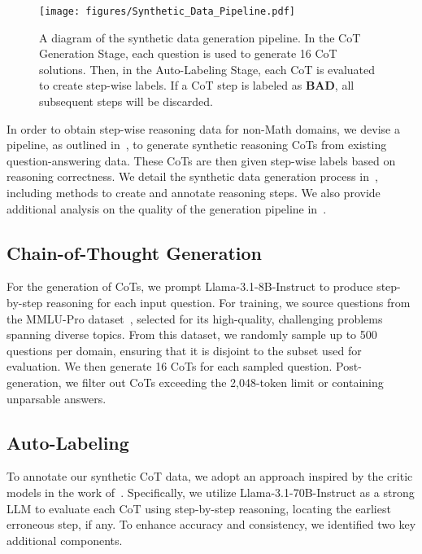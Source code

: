 \begin{figure*}[ht]
    \begin{center}
        \texttt{[image: figures/Synthetic\_Data\_Pipeline.pdf]}
        \caption{A diagram of the synthetic data generation pipeline. In the CoT Generation Stage, each question is used to generate 16 CoT solutions. Then, in the Auto-Labeling Stage, each CoT is evaluated to create step-wise labels. If a CoT step is labeled as \textbf{BAD}, all subsequent steps will be discarded.}
        \label{fig:synth-data-pipeline-diagram}
    \end{center}
    \vskip -0.2in
\end{figure*}




In order to obtain step-wise reasoning data for non-Math domains,
we devise a pipeline,
as outlined in~,
to generate synthetic reasoning CoTs from existing question-answering data.
These CoTs are then given step-wise labels based on reasoning correctness.
We detail the synthetic data generation process in~,
including methods to create and annotate reasoning steps. We also provide additional analysis on the quality of the generation pipeline in~.


\subsection{Chain-of-Thought Generation}
\label{sec:cot-gen}




For the generation of CoTs,
we prompt Llama-3.1-8B-Instruct to produce step-by-step reasoning for each input question. For training, we source questions from the MMLU-Pro dataset~\citep{wang2024mmlupro}, selected for its high-quality, challenging problems spanning diverse topics.
From this dataset, we randomly sample up to 500 questions per domain, ensuring that it is disjoint to the subset used for evaluation. We then generate 16 CoTs for each sampled question. Post-generation, we filter out CoTs exceeding the 2,048-token limit or containing unparsable answers.


\subsection{Auto-Labeling}
\label{sec:auto}


To annotate our synthetic CoT data, we adopt an approach inspired by the critic models in the work of~\citet{zheng2024processbench}.
Specifically, we utilize Llama-3.1-70B-Instruct as a strong LLM to evaluate each CoT using step-by-step reasoning, locating the earliest erroneous step, if any. To enhance accuracy and consistency, we identified two key additional components.


